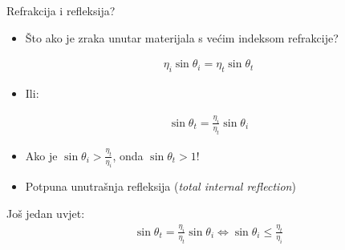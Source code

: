 \documentclass[9pt]{beamer}
\begin{document}
%	

\begin{frame}{Refrakcija i refleksija?}
	\begin{itemize}
		\item Što ako je zraka unutar materijala s većim indeksom refrakcije?
	\end{itemize}
	\begin{align*}
	\eta_i \sin \theta_i = \eta_t \sin \theta_t
	\end{align*}
	\begin{itemize}
		\item Ili:
	\end{itemize}
	\begin{align*}
	\sin \theta_t = \frac{\eta_i}{\eta_t} \sin \theta_i
	\end{align*}
	\begin{itemize}
		\item Ako je $\sin \theta_i > \frac{\eta_t}{\eta_i}$, onda $\sin \theta_t > 1$! 
		\item Potpuna unutrašnja refleksija (\textit{total internal reflection})
	\end{itemize}
	Još jedan uvjet:
	\begin{align*}
		\sin \theta_t = \frac{\eta_i}{\eta_t} \sin \theta_i \Leftrightarrow \sin \theta_i \leq \frac{\eta_t}{\eta_i}
	\end{align*}
\end{frame}
\end{document}
